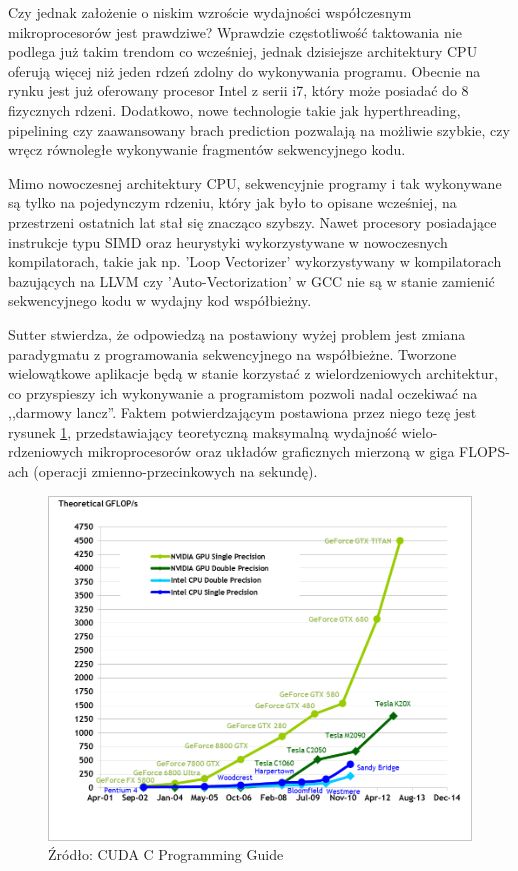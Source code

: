 Czy jednak założenie o niskim wzroście wydajności współczesnym mikroprocesorów
jest prawdziwe? Wprawdzie częstotliwość taktowania nie podlega już takim trendom
co wcześniej, jednak dzisiejsze architektury CPU oferują więcej niż jeden rdzeń
zdolny do wykonywania programu. Obecnie na rynku jest już oferowany procesor
Intel z serii i7, który może posiadać do 8 fizycznych rdzeni. Dodatkowo, nowe
technologie takie jak hyperthreading, pipelining czy zaawansowany brach
prediction pozwalają na możliwie szybkie, czy wręcz równoległe wykonywanie
fragmentów sekwencyjnego kodu.

Mimo nowoczesnej architektury CPU, sekwencyjnie programy i tak wykonywane są
tylko na pojedynczym rdzeniu\cite{massive}, który jak było to opisane wcześniej,
na przestrzeni ostatnich lat stał się znacząco szybszy. Nawet 
procesory posiadające instrukcje typu SIMD oraz heurystyki wykorzystywane w
nowoczesnych kompilatorach, takie jak np. 'Loop Vectorizer' wykorzystywany w
kompilatorach bazujących na LLVM \cite{llvm} czy 'Auto-Vectorization' w GCC
\cite{gcc} nie są w stanie zamienić sekwencyjnego kodu w wydajny kod
współbieżny.

Sutter stwierdza, że odpowiedzą na postawiony wyżej problem jest zmiana
paradygmatu z programowania sekwencyjnego na współbieżne. Tworzone wielowątkowe
aplikacje będą w stanie korzystać z wielordzeniowych architektur, co przyspieszy
ich wykonywanie a programistom pozwoli nadal oczekiwać na ,,darmowy lancz''.
Faktem potwierdzającym postawiona przez niego tezę jest rysunek \ref{gflops},
przedstawiający teoretyczną maksymalną wydajność wielo-rdzeniowych mikroprocesorów oraz układów
graficznych mierzoną w giga FLOPS-ach (operacji zmienno-przecinkowych na
sekundę).

\begin{figure}[ht]\label{gflops}
\centering
\includegraphics[scale=0.4]{images/floating-point-operations-per-second.png}
\caption{Źródło: CUDA C Programming Guide}
\end{figure}

